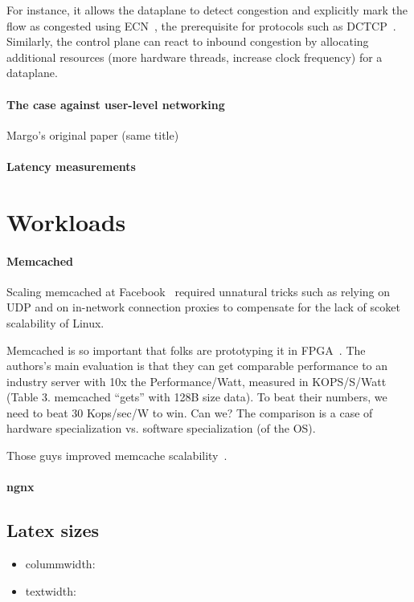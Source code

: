 For instance, it allows the dataplane to detect
congestion and explicitly mark the flow as congested using
ECN~\cite{ramakrishnan2001addition}, the prerequisite for protocols
such as DCTCP~\cite{DBLP:conf/sigcomm/AlizadehGMPPPSS10}. Similarly,
the control plane can react to inbound congestion by allocating
additional resources (more hardware threads, increase clock frequency)
for a dataplane.




\paragraph{The case against user-level networking}
Margo's original paper (same title)~\cite{magoutis2004case}

\paragraph*{Latency measurements}  

\section{Workloads}

\paragraph*{Memcached} 
Scaling memcached at Facebook~\cite{nishtala2013scaling} required
unnatural tricks such as relying on UDP and on in-network connection
proxies to compensate for the lack of scoket scalability of Linux.

Memcached is so important that folks are prototyping it in
FPGA~\cite{DBLP:conf/fpga/ChalamalasettiLWARM13}.  The authors's main evaluation is
that they can get comparable performance to an industry server with
10x the Performance/Watt, measured in KOPS/S/Watt (Table 3. memcached
``gets'' with 128B size data). To beat their numbers, we need to beat
30 Kops/sec/W to win.  Can we?  The comparison is a case of hardware
specialization vs. software specialization (of the OS).

Those guys improved memcache scalability~\cite{fan2013memc3}.



\paragraph*{ngnx}

\subsection{Latex sizes}

\begin{itemize}

\item colummwidth: \the\columnwidth
\item textwidth:  \the\textwidth
\end{itemize}
